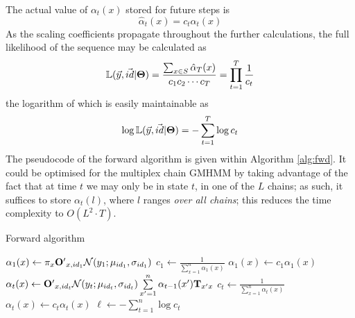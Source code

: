 \documentclass[12pt,a4paper,twoside,openright]{report}
\begin{document}
The actual value of $\alpha_t(x)$ stored for future steps is
\[\hat{\alpha}_t(x) = c_t\alpha_t(x)\]
As the scaling coefficients propagate throughout the further calculations, the full likelihood of the sequence may be calculated as
\[\mathbb{L}(\vec{y}, \vec{id}|{\bf \Theta}) = \frac{\sum_{x \in S}\hat{\alpha}_T(x)}{c_1c_2\cdots c_T} = \prod_{t=1}^{T} \frac{1}{c_t}\]
the logarithm of which is easily maintainable as
\[\log{\mathbb{L}(\vec{y}, \vec{id}|{\bf \Theta})} = -\sum_{t=1}^{T} {\log{c_t}}\]
The pseudocode of the forward algorithm is given within Algorithm \ref{alg:fwd}. It could be optimised for the multiplex chain GMHMM by taking advantage of the fact that at time $t$ we may only be in state $t$, in one of the $L$ chains; as such, it suffices to store $\alpha_t(l)$, where $l$ ranges \emph{over all chains}; this reduces the time complexity to $O(L^2\cdot T)$.

\begin{algorithm}[H]
\caption{Forward algorithm}\label{alg:fwd}
\begin{algorithmic}[1]
 
		\State $\alpha_1(x)\gets\pi_x{\bf O'}_{x,id_1}\mathcal{N}(y_1; \mu_{id_1}, \sigma_{id_1})$ 
	\EndFor
	\State $c_1\gets \frac{1}{\sum\limits_{x = 1}^{n}{\alpha_1(x)}}$ 
		\State $\alpha_1(x)\gets c_1\alpha_1(x)$ 
	\EndFor
		 
			\State $\alpha_t(x)\gets{\bf O'}_{x,id_{t}}\mathcal{N}(y_{t}; \mu_{id_{t}}, \sigma_{id_{t}})\sum\limits_{x'=1}^{n}{\alpha_{t-1}(x'){\bf T}_{x'x}}$
		\EndFor
		\State $c_t\gets \frac{1}{\sum\limits_{x=1}^{n}{\alpha_t(x)}}$ 
			\State $\alpha_t(x)\gets c_t\alpha_t(x)$ 
		\EndFor
	\EndFor
	\State $\ell\gets -\sum\limits_{t=1}^{n}{\log{c_t}}$ 
	\State {}
\EndFunction
{}
\end{algorithmic}
\end{algorithm}
\end{document}
